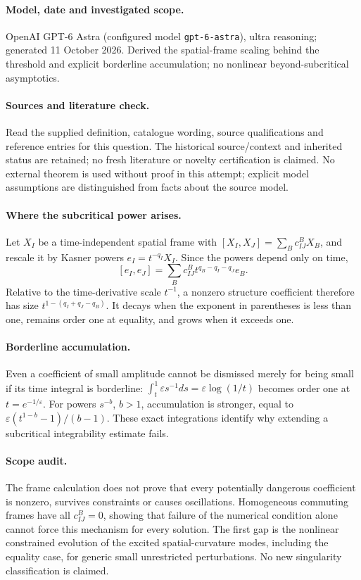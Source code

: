 \documentclass[11pt]{article}
\begin{document}
\paragraph{Model, date and investigated scope.}
OpenAI GPT-6 Astra (configured model \texttt{gpt-6-astra}), ultra reasoning; generated 11 October 2026. Derived the spatial-frame scaling behind the threshold and explicit borderline accumulation; no nonlinear beyond-subcritical asymptotics.

\paragraph{Sources and literature check.}
Read the supplied definition, catalogue wording, source qualifications and reference entries for this question. The historical source/context and inherited status are retained; no fresh literature or novelty certification is claimed. No external theorem is used without proof in this attempt; explicit model assumptions are distinguished from facts about the source model.

\paragraph{Where the subcritical power arises.} Let \(X_I\) be a time-independent spatial frame with \([X_I,X_J]=\sum_B c_{IJ}^B X_B\), and rescale it by Kasner powers \(e_I=t^{-q_I}X_I\). Since the powers depend only on time,
\[
 [e_I,e_J]=\sum_B c_{IJ}^B t^{q_B-q_I-q_J}e_B.
\]
Relative to the time-derivative scale \(t^{-1}\), a nonzero structure coefficient therefore has size \(t^{1-(q_I+q_J-q_B)}\). It decays when the exponent in parentheses is less than one, remains order one at equality, and grows when it exceeds one.
\paragraph{Borderline accumulation.} Even a coefficient of small amplitude cannot be dismissed merely for being small if its time integral is borderline: \(\int_t^1\varepsilon s^{-1}ds=\varepsilon\log(1/t)\) becomes order one at \(t=e^{-1/\varepsilon}\). For powers \(s^{-b}\), \(b>1\), accumulation is stronger, equal to \(\varepsilon(t^{1-b}-1)/(b-1)\). These exact integrations identify why extending a subcritical integrability estimate fails.
\paragraph{Scope audit.} The frame calculation does not prove that every potentially dangerous coefficient is nonzero, survives constraints or causes oscillations. Homogeneous commuting frames have all \(c_{IJ}^B=0\), showing that failure of the numerical condition alone cannot force this mechanism for every solution. The first gap is the nonlinear constrained evolution of the excited spatial-curvature modes, including the equality case, for generic small unrestricted perturbations. No new singularity classification is claimed.
\end{document}

